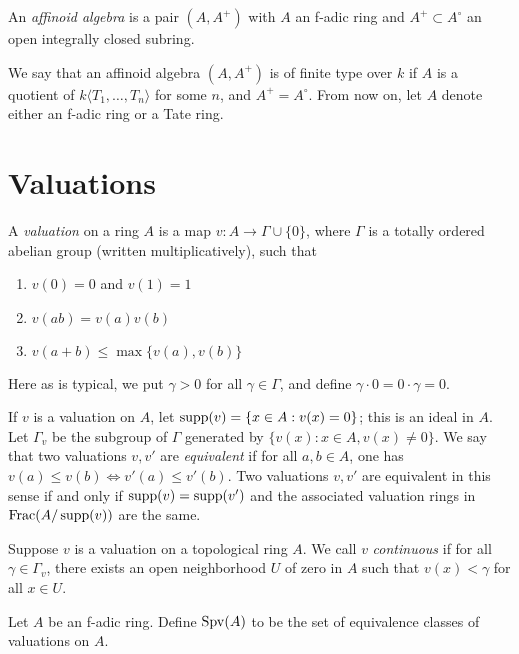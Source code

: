\documentclass{article}
\begin{document}
\begin{definition}
An \emph{affinoid algebra} is a pair $(A,A^+)$ with $A$ an f-adic ring and 
$A^+\subset A^\circ$ an open integrally closed subring. 
\end{definition}

We say that an affinoid algebra $(A,A^+)$ is of finite type over $k$ if 
$A$ is a quotient of $k\langle T_1,\dots,T_n\rangle$ for some $n$, and 
$A^+=A^\circ$. From now on, let $A$ denote either an f-adic ring or a Tate 
ring. 





\section{Valuations}

\begin{definition}
A \emph{valuation} on a ring $A$ is a map $v:A\to \Gamma\cup\{0\}$, where 
$\Gamma$ is a totally ordered abelian group (written multiplicatively), such 
that 
\begin{enumerate}
  \item $v(0)=0$ and $v(1)=1$ 
  \item $v(a b) = v(a) v(b)$ 
  \item $v(a+b)\leqslant \max\{v(a),v(b)\}$
\end{enumerate}
\end{definition}
Here as is typical, we put $\gamma>0$ for all $\gamma\in \Gamma$, and define 
$\gamma\cdot 0 = 0\cdot \gamma = 0$. 

If $v$ is a valuation on $A$, let $\operatorname{supp}(v) = \{x\in A:v(x)=0\}$; this is an 
ideal in $A$. Let $\Gamma_v$ be the subgroup of $\Gamma$ generated by 
$\{v(x):x\in A,v(x)\ne 0\}$. We say that two valuations $v,v'$ are 
\emph{equivalent} if for all $a,b\in A$, one has 
$v(a)\leqslant v(b)\Leftrightarrow v'(a)\leqslant v'(b)$. Two valuations 
$v,v'$ are equivalent in this sense if and only if $\operatorname{supp}(v)=\operatorname{supp}(v')$ and 
the associated valuation rings in $\operatorname{Frac}(A/\operatorname{supp}(v))$ are the 
same. 

Suppose $v$ is a valuation on a topological ring $A$. We call $v$ 
\emph{continuous} if for all $\gamma\in \Gamma_v$, there exists an open 
neighborhood $U$ of zero in $A$ such that $v(x)<\gamma$ for all $x\in U$. 

\begin{definition}
Let $A$ be an f-adic ring. Define $\operatorname{Spv}(A)$ to be the set of equivalence 
classes of valuations on $A$. 
\end{definition}
\end{document}

